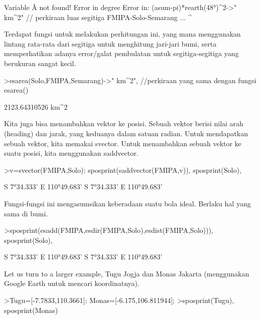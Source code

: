 \documentclass[a4paper,11pt,oneside,enabledeprecatedfontcommands]{scrbook}
\newenvironment{eulernotebook}{}{}
\newenvironment{eulercomment}{\par\medskip\noindent}{\par\medskip}
\begin{document}
\begin{eulernotebook}
\begin{euleroutput}
Variable Â not found!
Error in degree
Error in:
(asum-pi)*rearth(48°)^2->" km^2" // perkiraan luas segitiga FMIPA-Solo-Semarang ...
                     ^
\end{euleroutput}
\begin{eulercomment}
Terdapat fungsi untuk melakukan perhitungan ini, yang mana menggunakan lintang rata-rata dari
segitiga untuk menghitung jari-jari bumi, serta memperhatikan adanya error/galat pembulatan
untuk segitiga-segitiga yang berukuran sangat kecil.
\end{eulercomment}
\begin{eulerprompt}
>esarea(Solo,FMIPA,Semarang)->" km^2", //perkiraan yang sama dengan fungsi esarea()
\end{eulerprompt}
\begin{euleroutput}
2123.64310526 km^2
\end{euleroutput}
\begin{eulercomment}
Kita juga bisa menambahkan vektor ke posisi. Sebuah vektor berisi nilai
arah (heading) dan jarak, yang keduanya dalam satuan radian. Untuk mendapatkan sebuah vektor, kita memakai
svector. Untuk menambahkan sebuah vektor ke suatu posisi, kita menggunakan saddvector.
\end{eulercomment}
\begin{eulerprompt}
>v=svector(FMIPA,Solo); sposprint(saddvector(FMIPA,v)), sposprint(Solo),
\end{eulerprompt}
\begin{euleroutput}
S 7°34.333' E 110°49.683'
S 7°34.333' E 110°49.683'
\end{euleroutput}
\begin{eulercomment}
Fungsi-fungsi ini mengasumsikan keberadaan suatu bola ideal. Berlaku hal yang sama di bumi.
\end{eulercomment}
\begin{eulerprompt}
>sposprint(esadd(FMIPA,esdir(FMIPA,Solo),esdist(FMIPA,Solo))), sposprint(Solo),
\end{eulerprompt}
\begin{euleroutput}
S 7°34.333' E 110°49.683'
S 7°34.333' E 110°49.683'
\end{euleroutput}
\begin{eulercomment}
Let us turn to a larger example, Tugu Jogja dan Monas Jakarta (menggunakan Google Earth untuk mencari
koordinatnya).
\end{eulercomment}
\begin{eulerprompt}
>Tugu=[-7.7833,110.3661]; Monas=[-6.175,106.811944];
>sposprint(Tugu), sposprint(Monas)

\end{eulerprompt}
\end{eulernotebook}
\end{document}

